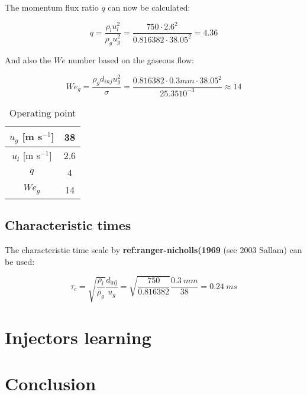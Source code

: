 The momentum flux ratio $q$ can now be calculated:

\begin{equation}
q = \frac{\rho_l u_l^2}{\rho_g u_g^2} = \frac{750 \cdot 2.6^2}{0.816382 \cdot 38.05^2} = 4.36
\end{equation}

And also the $We$ number based on the gaseous flow:

\begin{equation}
We_g = \frac{\rho_g d_{inj} u_g^2}{\sigma} = \frac{0.816382 \cdot 0.3 mm \cdot 38.05^2}{25.35 10^{-3}} \approx 14
\end{equation}


\begin{table}[!h]
\centering
\caption{Operating point}
\begin{tabular}{|c|c|}
\hline
$u_g$ [m s$^{-1}$] &  38 \\
\hline
$u_l$ [m s$^{-1}$] &  2.6 \\
\hline
\hline
$q$ & 4 \\ %
\hline
$We_g$ & 14 \\
\hline
\end{tabular}
\label{tab:bimer_sps_operating_point}
\end{table}



\subsection{Characteristic times}

The characteristic time scale by \textbf{ref:ranger-nicholls(1969} (see 2003 Sallam) can be used:

\begin{equation}
\tau_c = \sqrt{\frac{\rho_l}{\rho_g}} \frac{d_\mathrm{inj}}{u_g} = \sqrt{\frac{750}{0.816382 }} \frac{0.3 ~mm}{38} = 0.24 ~ms
\end{equation}

%
%

\section{Injectors learning}

\section{Conclusion}
